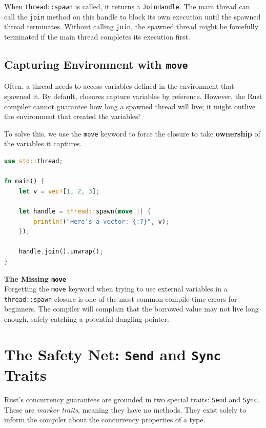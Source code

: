 When \texttt{thread::spawn} is called, it returns a \texttt{JoinHandle}. The main thread can call the \texttt{join} method on this handle to block its own execution until the spawned thread terminates. Without calling \texttt{join}, the spawned thread might be forcefully terminated if the main thread completes its execution first.

\subsection{Capturing Environment with \texttt{move}}

Often, a thread needs to access variables defined in the environment that spawned it. By default, closures capture variables by reference. However, the Rust compiler cannot guarantee how long a spawned thread will live; it might outlive the environment that created the variables!

To solve this, we use the \texttt{move} keyword to force the closure to take \textbf{ownership} of the variables it captures.

\begin{lstlisting}[language=Rust]
use std::thread;

fn main() {
    let v = vec![1, 2, 3];

    let handle = thread::spawn(move || {
        println!("Here's a vector: {:?}", v);
    });

    handle.join().unwrap();
}
\end{lstlisting}

\begin{warningbox}
\textbf{The Missing \texttt{move}} \\
Forgetting the \texttt{move} keyword when trying to use external variables in a \texttt{thread::spawn} closure is one of the most common compile-time errors for beginners. The compiler will complain that the borrowed value may not live long enough, safely catching a potential dangling pointer.
\end{warningbox}

\section{The Safety Net: \texttt{Send} and \texttt{Sync} Traits}

Rust's concurrency guarantees are grounded in two special traits: \texttt{Send} and \texttt{Sync}. These are \textit{marker traits}, meaning they have no methods. They exist solely to inform the compiler about the concurrency properties of a type.


